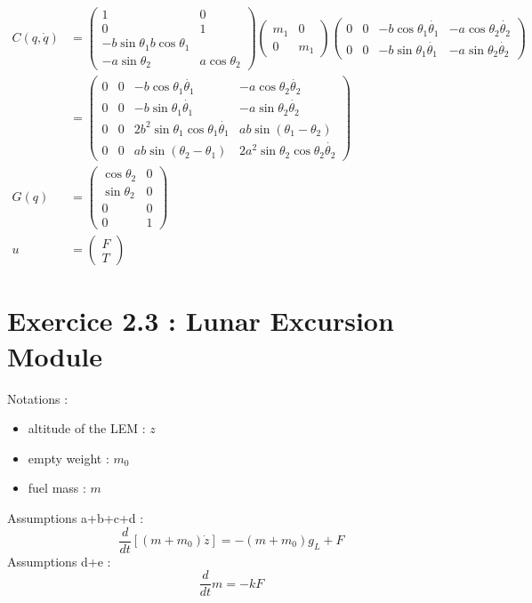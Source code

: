 \begin{align*}
C(q,\dot{q}) &= \left( \begin{array}{cccc}
1 & 0\\
0 & 1\\
-b\sin\theta_1 b\cos\theta_1\\
-a\sin\theta_2 & a\cos\theta_2
\end{array} \right)  \left( \begin{array}{cc}
m_1 & 0\\
0 & m_1
\end{array} \right)
\left( \begin{array}{cccc}
0 & 0 & -b\cos\theta_1\dot{\theta_1} & -a\cos\theta_2\dot{\theta_2} \\
0 & 0 & -b\sin\theta_1\dot{\theta_1} & -a\sin\theta_2\dot{\theta_2}
\end{array} \right)\\
&= \left( \begin{array}{cccc}
0 & 0 & -b\cos\theta_1\dot{\theta_1} & -a\cos\theta_2\dot{\theta_2} \\
0 & 0 & -b\sin\theta_1\dot{\theta_1} & -a\sin\theta_2\dot{\theta_2} \\
0 & 0 & 2b^2\sin\theta_1\cos\theta_1\dot{\theta_1} & ab\sin(\theta_1 - \theta_2) \\
0 & 0 & ab\sin(\theta_2 - \theta_1) & 2a^2\sin\theta_2\cos\theta_2\dot{\theta_2}
\end{array} \right)\\
G(q) &= \left( \begin{array}{cc}
\cos\theta_2 & 0\\
\sin\theta_2 & 0\\
0 & 0\\
0 & 1
\end{array} \right)\\
u &= \left( \begin{array}{c}
F\\
T
\end{array} \right)
\end{align*}

\section{Exercice 2.3 : Lunar Excursion Module}
Notations :
\begin{itemize}
\item altitude of the LEM : $z$
\item empty weight : $m_0$
\item fuel mass : $m$
\end{itemize}
Assumptions a+b+c+d :
$$\frac{d}{dt}[(m+m_0)\dot{z}] = -(m+m_0)g_L +F$$
Assumptions d+e :
$$\frac{d}{dt}m = -kF$$

